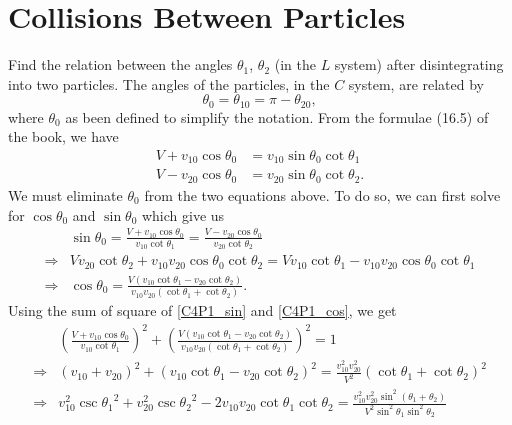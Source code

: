 \chapter{Collisions Between Particles}


\begin{problem}
{
Find the relation between the angles $\theta_1$, $\theta_2$ (in the $L$ system) after disintegrating into two particles.
}
{
The angles of the particles, in the $C$ system, are related by
\begin{equation*}
\theta_0 = \theta_{10} = \pi - \theta_{20},
\end{equation*}
where $\theta_0$ as been defined to simplify the notation. From the formulae (16.5) of the book, we have
\begin{align*}
    V + v_{10}\cos{\theta_0} &= v_{10} \sin{\theta_0} \cot{\theta_1} \\
    V - v_{20}\cos{\theta_0} &= v_{20} \sin{\theta_0} \cot{\theta_2} .
\end{align*}
We must eliminate $\theta_0$ from the two equations above. To do so, we can first solve for $\cos{\theta_0}$ and $\sin{\theta_0}$ which give us
\begin{align}
    &\sin{\theta_0} = \frac{V + v_{10}\cos{\theta_0}}{v_{10}\cot{\theta_1}} = \frac{V - v_{20}\cos{\theta_0}}{v_{20}\cot{\theta_2}} \label{C4P1_sin} \\
    \Rightarrow& Vv_{20}\cot{\theta_2} + v_{10}v_{20}\cos{\theta_0}\cot{\theta_2} = Vv_{10}\cot{\theta_1} - v_{10}v_{20}\cos{\theta_0}\cot{\theta_1} \nonumber \\
    \Rightarrow& \cos{\theta_0} = \frac{V\left( v_{10}\cot{\theta_1} - v_{20}\cot{\theta_2} \right)}{v_{10}v_{20} \left( \cot{\theta_1} + \cot{\theta_2} \right)}.  \label{C4P1_cos}
\end{align}
Using the sum of square of \eqref{C4P1_sin} and \eqref{C4P1_cos}, we get
\begin{align*}
    &\left( \frac{V + v_{10}\cos{\theta_0}}{v_{10}\cot{\theta_1}} \right)^2 + \left( \frac{V\left( v_{10}\cot{\theta_1} - v_{20}\cot{\theta_2} \right)}{v_{10}v_{20} \left( \cot{\theta_1} + \cot{\theta_2} \right)} \right)^2 = 1 \\
    \Rightarrow& \left( v_{10} + v_{20} \right)^2 + \left( v_{10}\cot{\theta_1} - v_{20}\cot{\theta_2} \right)^2 = \frac{v_{10}^2v_{20}^2}{V^2} \left( \cot{\theta_1} + \cot{\theta_2} \right)^2 \\
    \Rightarrow& v_{10}^2 \csc{\theta_1}^2 + v_{20}^2 \csc{\theta_2}^2 - 2 v_{10}v_{20}\cot{\theta_1}\cot{\theta_2} = \frac{v_{10}^2v_{20}^2\sin^2{(\theta_1+\theta_2)}}{V^2\sin^2{\theta_1}\sin^2{\theta_2}} \\ 

\end{align*}}
\end{problem}

